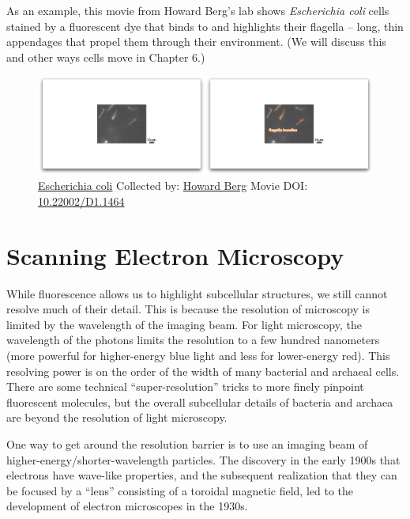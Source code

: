 \documentclass[]{tufte-book}
\begin{document}
As an example, this movie from Howard Berg's lab \citep{bergInternet}
\citep{turner2000} shows \emph{Escherichia coli} cells stained by a
fluorescent dye that binds to and highlights their flagella -- long,
thin appendages that propel them through their environment. (We will
discuss this and other ways cells move in Chapter 6.)





\begin{figure}
\includegraphics{movie_stills/1_2} \caption[\protect\hyperlink{tree}{Escherichia coli} Collected by:
\protect\hyperlink{howard_berg}{Howard Berg} Movie DOI:
\href{https://doi.org/10.22002/D1.1464}{10.22002/D1.1464}]{\protect\hyperlink{tree}{Escherichia coli} Collected by:
\protect\hyperlink{howard_berg}{Howard Berg} Movie DOI:
\href{https://doi.org/10.22002/D1.1464}{10.22002/D1.1464}}\label{fig:1-2}
\end{figure}

\section{Scanning Electron
Microscopy}\label{scanning-electron-microscopy}

While fluorescence allows us to highlight subcellular structures, we
still cannot resolve much of their detail. This is because the
resolution of microscopy is limited by the wavelength of the imaging
beam. For light microscopy, the wavelength of the photons limits the
resolution to a few hundred nanometers (more powerful for higher-energy
blue light and less for lower-energy red). This resolving power is on
the order of the width of many bacterial and archaeal cells. There are
some technical ``super-resolution'' tricks to more finely pinpoint
fluorescent molecules, but the overall subcellular details of bacteria
and archaea are beyond the resolution of light microscopy.

One way to get around the resolution barrier is to use an imaging beam
of higher-energy/shorter-wavelength particles. The discovery in the
early 1900s that electrons have wave-like properties, and the subsequent
realization that they can be focused by a ``lens'' consisting of a
toroidal magnetic field, led to the development of electron microscopes
in the 1930s.
\end{document}
